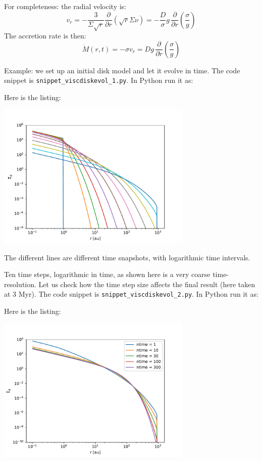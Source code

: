 \documentclass{book}
\newcommand{\code}[1]{{\small\tt #1}}
\begin{document}
For completeness: the radial velocity is:
\begin{equation}
  v_r = -\frac{3}{\Sigma \sqrt{r}}\frac{\partial}{\partial r}\left(\sqrt{r}\Sigma\nu\right)
  =-\frac{D}{\sigma}g\,\frac{\partial}{\partial r}\left(\frac{\sigma}{g}\right)
\end{equation}
The accretion rate is then:
\begin{equation}\label{eq-mdot-from-sigma-g}
  \dot M(r,t) = -\sigma v_r = D g\,\frac{\partial}{\partial r}\left(\frac{\sigma}{g}\right)
\end{equation}

Example: we set up an initial disk model and let it evolve in time. The code snippet is
\code{snippet\_viscdiskevol\_1.py}. In Python run it as:
\begin{codebox}
\end{codebox}
Here is the listing:

\centerline{\includegraphics[width=0.7\textwidth]{../snippets/fig_snippet_viscdiskevol_1_1.pdf}}
The different lines are different time snapshots, with logarithmic time intervals.

Ten time steps, logarithmic in time, as shown here is a very coarse time-resolution.
Let us check how the time step size affects the final result (here taken at 3 Myr).
The code snippet is
\code{snippet\_viscdiskevol\_2.py}. In Python run it as:
\begin{codebox}
\end{codebox}
Here is the listing:

\centerline{\includegraphics[width=0.7\textwidth]{../snippets/fig_snippet_viscdiskevol_2_1.pdf}}
\end{document}
